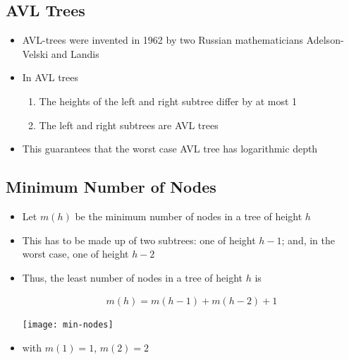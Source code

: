 \begin{slide}
\section{AVL Trees}

\begin{PauseHighLight}
  \begin{itemize}
  \item AVL-trees were invented in  1962 by two Russian mathematicians
    Adelson-Velski and Landis\pause
  \item In AVL trees
    \begin{enumerate}
    \item The heights of the left and right subtree differ by at most
      1\pause
    \item The left and right subtrees are AVL trees\pause
    \end{enumerate}
  \item This guarantees that the worst case AVL tree has logarithmic
    depth\pause
  \end{itemize}
\end{PauseHighLight}

\end{slide}


\begin{slide}
\section{Minimum Number of Nodes}

\begin{PauseHighLight}
  \begin{itemize}
  \item Let $m(h)$ be the minimum number of nodes in a tree of height
  $h$\pause
  \item This has to be made up of two subtrees: one of height $h-1$; and, in
    the worst case, one of height $h-2$\pause
  \item Thus, the least number of nodes in a tree of height $h$ is
    \begin{minipage}{12cm}
   \begin{align*}
      m(h) = m(h-1) + m(h-2) + 1
    \end{align*}
    \end{minipage}
    \begin{minipage}{10cm}
      \begin{center}
        \texttt{[image: min-nodes]}\pause
      \end{center}
    \end{minipage}
  \item with $m(1)=1$, $m(2)=2$\pause
  \end{itemize}
\end{PauseHighLight}

\end{slide}


